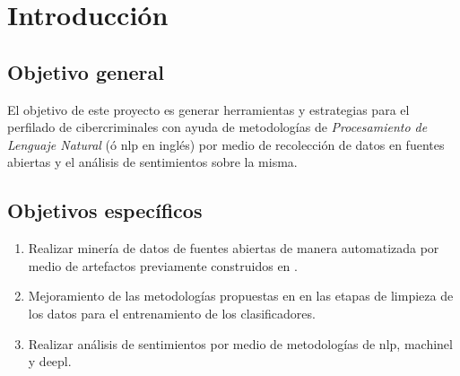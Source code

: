 \chapter{Introducción} %

\label{chIntroduction} %


\section{Objetivo general}
El objetivo de este proyecto es generar herramientas y estrategias para el perfilado de cibercriminales con ayuda de metodologías de \emph{Procesamiento de Lenguaje Natural} (\'o \gls{nlp} en ingl\'es) por medio de recolección de datos en fuentes abiertas y el análisis de sentimientos sobre la misma.

\section{Objetivos específicos}
\begin{enumerate}
\item Realizar minería de datos de fuentes abiertas de manera automatizada por medio de artefactos previamente construidos en \cite{osint}.
  
\item Mejoramiento de las metodologías propuestas en \cite{osint} en las etapas de limpieza de los datos para el entrenamiento de los clasificadores.

\item Realizar análisis de sentimientos por medio de metodologías de \gls{nlp}, \gls{machinel} y \gls{deepl}.
\end{enumerate}
